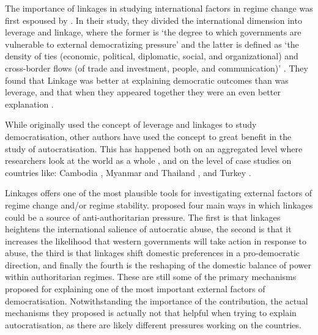 The importance of linkages in studying international factors in regime change was first espoused by \citet{levitsky_linkage_2006}. In their study, they divided the international dimension into leverage and linkage, where the former is `the degree to which governments are vulnerable to external democratizing pressure' and the latter is defined as `the density of ties (economic, political, diplomatic, social, and organizational) and cross-border flows (of trade and investment, people, and communication)' \citep[p. 379]{levitsky_linkage_2006}. They found that Linkage was better at explaining democratic outcomes than was leverage, and that when they appeared together they were an even better explanation \citep[pp. 388]{levitsky_linkage_2006}.

While \citeauthor{levitsky_linkage_2006} originally used the concept of leverage and linkages to study democratisation, other authors have used the concept to great benefit in the study of autocratisation. This has happened both on an aggregated level where researchers look at the world as a whole \citep{ambrosio_constructing_2010, hall_authoritarian_2017, tansey_ties_2017}, and on the level of case studies on countries like: Cambodia \citep{loughlin_chinese_2021}, Myanmar and Thailand \citep{wong_chinese_2019}, and Turkey \citep{yilmaz_authoritarian_2020}. 

Linkages offers one of the most plausible tools for investigating external factors of regime change and/or regime stability. \citet[pp. 383-386]{levitsky_linkage_2006} proposed four main ways in which linkages could be a source of anti-authoritarian pressure. The first is that linkages heightens the international salience of autocratic abuse, the second is that it increases the likelihood that western governments will take action in response to abuse, the third is that linkages shift domestic preferences in a pro-democratic direction, and finally the fourth is the reshaping of the domestic balance of power within authoritarian regimes. These are still some of the primary mechanisms proposed for explaining one of the most important external factors of democratisation. Notwithstanding the importance of the contribution, the actual mechanisms they proposed is actually not that helpful when trying to explain autocratisation, as there are likely different pressures working on the countries. 

